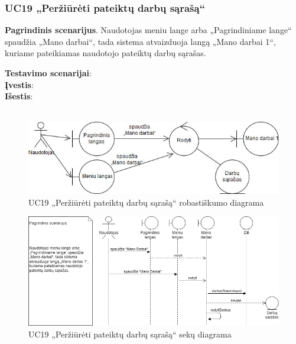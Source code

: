 \documentclass{VUMIFPSbakalaurinis}
\begin{document}
\subsubsection{UC19 „Peržiūrėti pateiktų darbų sąrašą“}
\textbf{Pagrindinis scenarijus}. Naudotojas meniu lange arba „Pagrindiniame lange“ spaudžia „Mano darbai“, tada sistema atvaizduoja langą „Mano darbai 1“, kuriame pateikiamas naudotojo pateiktų darbų sąrašas.
\par \textbf{Testavimo scenarijai}:\\
\textbf{Įvestis}: \\
\textbf{Išestis}: \\ \\

\begin{figure}[H]
	\centering
	\includegraphics[scale=0.6]{img/Robustness/UC19}
	\caption{UC19 „Peržiūrėti pateiktų darbų sąrašą“ robastiškumo diagrama}
	\label{img:uc19rob}
\end{figure}

\begin{figure}[H]
	\centering
	\includegraphics[scale=0.6]{img/Sequence/SD19}
	\caption{UC19 „Peržiūrėti pateiktų darbų sąrašą“ sekų diagrama}
	\label{img:uc19seq}
\end{figure}
\end{document}
